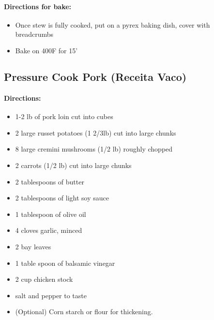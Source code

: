 \documentclass{article}
\begin{document}
\paragraph{Directions for bake:}
\begin{itemize}
	\item Once stew is fully cooked, put on a pyrex baking dish, cover with breadcrumbs
	\item Bake on 400F for 15'
\end{itemize}

\subsection{Pressure Cook Pork (Receita Vaco)}

\paragraph{Directions:}
\begin{itemize}
	\item	1-2 lb of pork loin cut into cubes
	\item 2 large russet potatoes (1 2/3lb) cut into large chunks
	\item 8 large cremini mushrooms (1/2 lb) roughly chopped
	\item 2 carrots (1/2 lb) cut into large chunks
	\item 2 tablespoons of butter
	\item 2 tablespoons of light soy sauce
	\item 1 tablespoon of olive oil
	\item 4 cloves garlic, minced
	\item 2 bay leaves
	\item 1 table spoon of balsamic vinegar
	\item 2 cup chicken stock
	\item salt and pepper to taste
	\item (Optional) Corn starch or flour for thickening.
\end{itemize}
\end{document}

